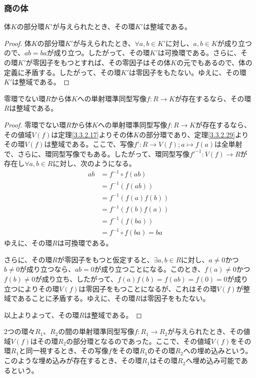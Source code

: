 \documentclass[dvipdfmx]{jsarticle}
\begin{document}
\subsubsection{商の体}%
\begin{thm}\label{3.3.2.29}
体$K$の部分環$K'$が与えられたとき、その環$K'$は整域である。
\end{thm}
\begin{proof}
体$K$の部分環$K'$が与えられたとき、$\forall a,b \in K'$に対し、$a,b \in K$が成り立つので、$ab = ba$が成り立つ。したがって、その環$K'$は可換環である。さらに、その環$K'$が零因子をもつとすれば、その零因子はその体$K$の元でもあるので、体の定義に矛盾する。したがって、その環$K'$は零因子をもたない。ゆえに、その環$K'$は整域である。
\end{proof}
\begin{thm}\label{3.3.2.30}
零環でない環$R$から体$K$への単射環準同型写像$f:R \rightarrow K$が存在するなら、その環$R$は整域である。
\end{thm}
\begin{proof}
零環でない環$R$から体$K$への単射環準同型写像$f:R \rightarrow K$が存在するなら、その値域$V(f)$は定理\ref{3.3.2.17}よりその体$K$の部分環であり、定理\ref{3.3.2.29}よりその環$V(f)$は整域である。ここで、写像$f':R \rightarrow V(f);a \mapsto f(a)$は全単射で、さらに、環同型写像でもある。したがって、環同型写像${f'}^{- 1}:V(f) \rightarrow R$が存在し$\forall a,b \in R$に対し、次のようになる。
\begin{align*}
ab &= f^{- 1} \circ f(ab)\\
&= f^{- 1}\left( f(ab) \right)\\
&= f^{- 1}\left( f(a)f(b) \right)\\
&= f^{- 1}\left( f(b)f(a) \right)\\
&= f^{- 1}\left( f(ba) \right)\\
&= f^{- 1} \circ f(ba) = ba
\end{align*}
ゆえに、その環$R$は可換環である。\par
さらに、その環$R$が零因子をもつと仮定すると、$\exists a,b \in R$に対し、$a \neq 0$かつ$b \neq 0$が成り立つなら、$ab = 0$が成り立つことになる。このとき、$f(a) \neq 0$かつ$f(b) \neq 0$が成り立ち、したがって、$f(a)f(b) = f(ab) = f(0) = 0$が成り立つによりその環$V(f)$は零因子をもつことになるが、これはその環$V(f)$が整域であることに矛盾する。ゆえに、その環$R$は零因子をもたない。\par
以上よりよって、その環$R$は整域である。
\end{proof}
\begin{dfn}
2つの環々$R_{1}$、$R_{2}$の間の単射環準同型写像$f:R_{1} \rightarrow R_{2}$が与えられたとき、その値域$V(f)$はその環$R_{2}$の部分環となるのであった。ここで、その値域$V(f)$をその環$R_{1}$と同一視するとき、その写像$f$をその環$R_{1}$のその環$R_{2}$への埋め込みという。このような埋め込みが存在するとき、その環$R_{1}$はその環$R_{2}$へ埋め込み可能であるという。
\end{dfn}
\end{document}
